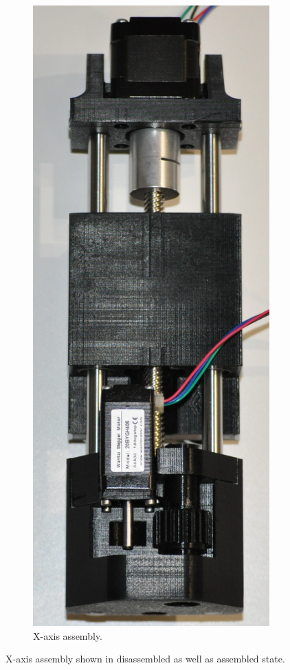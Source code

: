 \begin{figure}[H]
\begin{subfigure}[b]{0.212\textwidth}
		\includegraphics[width=\textwidth]{figures/202108/assembled-x-axis-assembly.JPG}
		\caption{X-axis assembly.}
		\label{fig:assembled-x-axis-assembly}
	\end{subfigure}
	\captionsetup{singlelinecheck = false, justification=justified}
	\caption{X-axis assembly shown in disassembled as well as assembled state.}
	\label{fig:physical-x-axis-assembly}
\end{figure}

